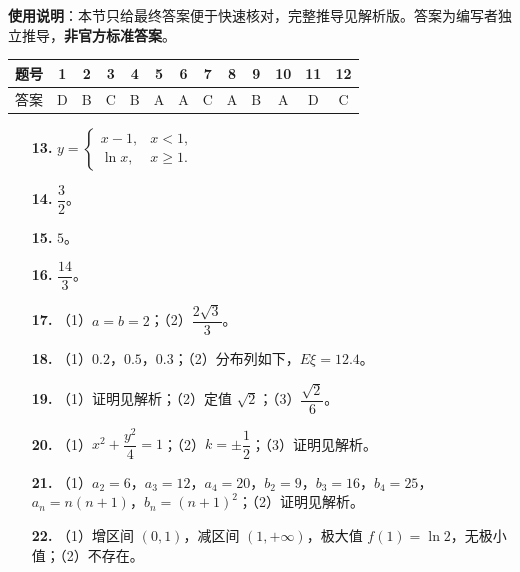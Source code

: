
\begin{gknotice}
\textbf{使用说明}：本节只给最终答案便于快速核对，完整推导见解析版。答案为编写者独立推导，\textbf{非官方标准答案}。
\end{gknotice}

\begin{center}\begin{tabular}{ccccccccccccc}
\toprule
题号 & 1 & 2 & 3 & 4 & 5 & 6 & 7 & 8 & 9 & 10 & 11 & 12 \\
\midrule
答案 & D & B & C & B & A & A & C & A & B & A & D & C \\
\bottomrule
\end{tabular}\end{center}

\begin{itemize}[leftmargin=2.6em]
  \item[\textbf{13.}] $y=\begin{cases}x-1,&x<1,\\ \ln x,&x\geqslant1.\end{cases}$
  \item[\textbf{14.}] $\dfrac32$。
  \item[\textbf{15.}] $5$。
  \item[\textbf{16.}] $\dfrac{14}3$。
\end{itemize}

\begin{itemize}[leftmargin=2.6em]
  \item[\textbf{17.}] （1）$a=b=2$；（2）$\dfrac{2\sqrt3}3$。
  \item[\textbf{18.}] （1）$0.2$，$0.5$，$0.3$；（2）分布列如下，$E\xi=12.4$。
  \item[\textbf{19.}] （1）证明见解析；（2）定值 $\sqrt2$；（3）$\dfrac{\sqrt2}6$。
  \item[\textbf{20.}] （1）$x^2+\dfrac{y^2}4=1$；（2）$k=\pm\dfrac12$；（3）证明见解析。
  \item[\textbf{21.}] （1）$a_2=6$，$a_3=12$，$a_4=20$，$b_2=9$，$b_3=16$，$b_4=25$，$a_n=n(n+1)$，$b_n=(n+1)^2$；（2）证明见解析。
  \item[\textbf{22.}] （1）增区间 $(0,1)$，减区间 $(1,+\infty)$，极大值 $f(1)=\ln2$，无极小值；（2）不存在。
\end{itemize}
